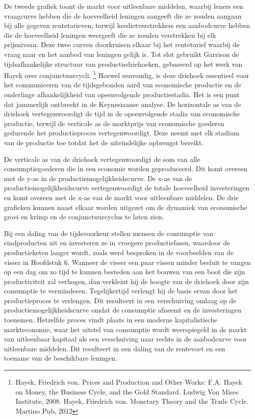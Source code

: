 \documentclass[
  a5paper,
  smalldemyvopaper,11pt,twoside,onecolumn,openright,extrafontsizes,
hidelinks]{memoir}
\begin{document}
De tweede grafiek toont de markt voor uitleenbare middelen, waarbij
leners een vraagcurve hebben die de hoeveelheid leningen aangeeft die ze
zouden aangaan bij alle gegeven rentetarieven, terwijl
kredietverstrekkers een aanbodcurve hebben die de hoeveelheid leningen
weergeeft die ze zouden verstrekken bij elk prijsniveau. Deze twee
curven doorkruisen elkaar bij het rentetarief waarbij de vraag naar en
het aanbod van leningen gelijk is. Tot slot gebruikt Garrison de
tijdsafhankelijke structuur van productiedriehoeken, gebaseerd op het
werk van Hayek over conjunctuurcycli. \footnote{Hayek, Friedrich von.
  Prices and Production and Other Works: F.A. Hayek on Money, the
  Business Cycle, and the Gold Standard. Ludwig Von Mises Institute,
  2008. Hayek, Friedrich von. Monetary Theory and the Trade Cycle.
  Martino Pub, 2012} Hoewel eenvoudig, is deze driehoek essentieel voor
het communiceren van de tijdsgebonden aard van economische productie en
de onderlinge afhankelijkheid van opeenvolgende productiestadia. Het is
een punt dat jammerlijk ontbreekt in de Keynesiaanse analyse. De
horizontale as van de driehoek vertegenwoordigt de tijd in de
opeenvolgende stadia van economische productie, terwijl de verticale as
de marktprijs van economische goederen gedurende het productieproces
vertegenwoordigt. Deze neemt met elk stadium van de productie toe totdat
het de uiteindelijke opbrengst bereikt.

De verticale as van de driehoek vertegenwoordigt de som van alle
consumptiegoederen die in een economie worden geproduceerd. Dit komt
overeen met de y-as in de productiemogelijkheidscurve. De x-as van de
productiemogelijkheidscurve vertegenwoordigt de totale hoeveelheid
investeringen en komt overeen met de x-as van de markt voor uitleenbare
middelen. De drie grafieken kunnen naast elkaar worden uitgezet om de
dynamiek van economische groei en krimp en de conjunctuurcyclus te laten
zien.

Bij een daling van de tijdsvoorkeur stellen mensen de consumptie van
eindproducten uit en investeren ze in vroegere productiefasen, waardoor
de productieketen langer wordt, zoals werd besproken in de voorbeelden
van de visser in Hoofdstuk 6. Wanneer de visser een paar vissen minder
besluit te vangen op een dag om zo tijd te kunnen besteden aan het
bouwen van een boot die zijn productiviteit zal verhogen, dan verkleint
hij de hoogte van de driehoek door zijn consumptie te verminderen.
Tegelijkertijd verlengt hij de basis ervan door het productieproces te
verlengen. Dit resulteert in een verschuiving omlaag op de
productiemogelijkheidscurve omdat de consumptie afneemt en de
investeringen toenemen. Hetzelfde proces vindt plaats in een moderne
kapitalistische markteconomie, waar het uitstel van consumptie wordt
weerspiegeld in de markt van uitleenbaar kapitaal als een verschuiving
naar rechts in de aanbodcurve voor uitleenbare middelen. Dit resulteert
in een daling van de rentevoet en een toename van de beschikbare
leningen.
\end{document}
